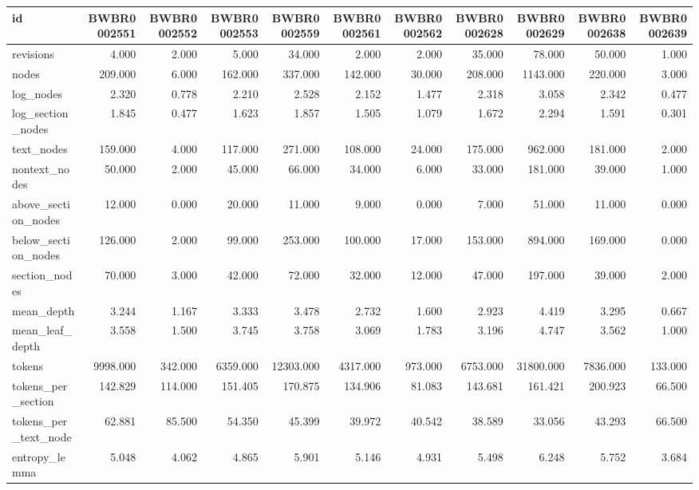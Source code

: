 \begin{tabular}{lrrrrrrrrrr}
\toprule
id & BWBR0002551 & BWBR0002552 & BWBR0002553 & BWBR0002559 & BWBR0002561 & BWBR0002562 & BWBR0002628 & BWBR0002629 & BWBR0002638 & BWBR0002639 \\
\midrule
revisions & 4.000 & 2.000 & 5.000 & 34.000 & 2.000 & 2.000 & 35.000 & 78.000 & 50.000 & 1.000 \\
\cline{1-11}
nodes & 209.000 & 6.000 & 162.000 & 337.000 & 142.000 & 30.000 & 208.000 & 1143.000 & 220.000 & 3.000 \\
\cline{1-11}
log\_nodes & 2.320 & 0.778 & 2.210 & 2.528 & 2.152 & 1.477 & 2.318 & 3.058 & 2.342 & 0.477 \\
\cline{1-11}
log\_section\_nodes & 1.845 & 0.477 & 1.623 & 1.857 & 1.505 & 1.079 & 1.672 & 2.294 & 1.591 & 0.301 \\
\cline{1-11}
text\_nodes & 159.000 & 4.000 & 117.000 & 271.000 & 108.000 & 24.000 & 175.000 & 962.000 & 181.000 & 2.000 \\
\cline{1-11}
nontext\_nodes & 50.000 & 2.000 & 45.000 & 66.000 & 34.000 & 6.000 & 33.000 & 181.000 & 39.000 & 1.000 \\
\cline{1-11}
above\_section\_nodes & 12.000 & 0.000 & 20.000 & 11.000 & 9.000 & 0.000 & 7.000 & 51.000 & 11.000 & 0.000 \\
\cline{1-11}
below\_section\_nodes & 126.000 & 2.000 & 99.000 & 253.000 & 100.000 & 17.000 & 153.000 & 894.000 & 169.000 & 0.000 \\
\cline{1-11}
section\_nodes & 70.000 & 3.000 & 42.000 & 72.000 & 32.000 & 12.000 & 47.000 & 197.000 & 39.000 & 2.000 \\
\cline{1-11}
mean\_depth & 3.244 & 1.167 & 3.333 & 3.478 & 2.732 & 1.600 & 2.923 & 4.419 & 3.295 & 0.667 \\
\cline{1-11}
mean\_leaf\_depth & 3.558 & 1.500 & 3.745 & 3.758 & 3.069 & 1.783 & 3.196 & 4.747 & 3.562 & 1.000 \\
\cline{1-11}
tokens & 9998.000 & 342.000 & 6359.000 & 12303.000 & 4317.000 & 973.000 & 6753.000 & 31800.000 & 7836.000 & 133.000 \\
\cline{1-11}
tokens\_per\_section & 142.829 & 114.000 & 151.405 & 170.875 & 134.906 & 81.083 & 143.681 & 161.421 & 200.923 & 66.500 \\
\cline{1-11}
tokens\_per\_text\_node & 62.881 & 85.500 & 54.350 & 45.399 & 39.972 & 40.542 & 38.589 & 33.056 & 43.293 & 66.500 \\
\cline{1-11}
entropy\_lemma & 5.048 & 4.062 & 4.865 & 5.901 & 5.146 & 4.931 & 5.498 & 6.248 & 5.752 & 3.684 \\

\end{tabular}
